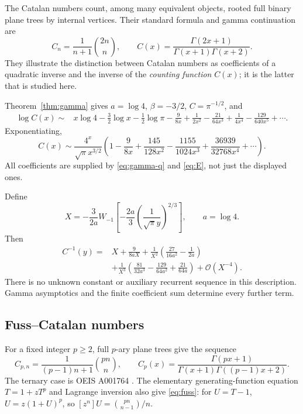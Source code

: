 \documentclass[11pt,a4paper]{article}
\numberwithin{equation}{section}
\theoremstyle{definition}
\theoremstyle{remark}
\newcommand{\bigO}{\mathcal O}
\begin{document}
The Catalan numbers count, among many equivalent objects, rooted full binary plane trees by internal vertices. Their standard formula and gamma continuation are \cite{oeiscatalan,wlcatalan}
\begin{equation}
 C_n=\frac1{n+1}\binom{2n}{n},\qquad
 C(x)=\frac{\Gamma(2x+1)}{\Gamma(x+1)\Gamma(x+2)}.
 \label{eq:catalan}
\end{equation}
They illustrate the distinction between Catalan numbers as coefficients of a quadratic inverse and the inverse of the \emph{counting function} $C(x)$; it is the latter that is studied here.

Theorem~\ref{thm:gamma} gives $a=\log4$, $\beta=-3/2$, $C=\pi^{-1/2}$, and
\begin{align}
 \log C(x)\sim{}&x\log4-\frac32\log x-\frac12\log\pi
 -\frac9{8x}+\frac1{2x^2}-\frac{21}{64x^3}
 +\frac1{4x^4}-\frac{129}{640x^5}+\cdots.
 \label{eq:catalan-log}
\end{align}
Exponentiating,
\begin{equation}
 C(x)\sim\frac{4^x}{\sqrt\pi x^{3/2}}
 \left(1-\frac9{8x}+\frac{145}{128x^2}
        -\frac{1155}{1024x^3}+\frac{36939}{32768x^4}+\cdots\right).
 \label{eq:catalan-amplitude}
\end{equation}
All coefficients are supplied by \eqref{eq:gamma-q} and \eqref{eq:E}, not just the displayed ones.

Define
\begin{equation}
 X=-\frac3{2a}W_{-1}\!\left[
       -\frac{2a}{3}\left(\frac1{\sqrt\pi y}\right)^{2/3}\right],
 \qquad a=\log4.
 \label{eq:catalan-core}
\end{equation}
Then
\begin{align}
 C^{-1}(y)={}&X+\frac9{8aX}
 +\frac1{X^2}\left(\frac{27}{16a^2}-\frac1{2a}\right)\nonumber\\
 &+\frac1{X^3}\left(\frac{81}{32a^3}-\frac{129}{64a^2}
                    +\frac{21}{64a}\right)+\bigO(X^{-4}).
 \label{eq:catalan-inverse}
\end{align}
There is no unknown constant or auxiliary recurrent sequence in this description. Gamma asymptotics and the finite coefficient sum determine every further term.

\subsection{Fuss--Catalan numbers}

For a fixed integer $p\ge2$, full $p$-ary plane trees give the sequence
\begin{equation}
 C_{p,n}=\frac1{(p-1)n+1}\binom{pn}{n},\qquad
 C_p(x)=\frac{\Gamma(px+1)}{\Gamma(x+1)\Gamma((p-1)x+2)}.
 \label{eq:fuss}
\end{equation}
The ternary case is OEIS A001764 \cite{oeisfuss}. The elementary generating-function equation $T=1+zT^p$ and Lagrange inversion also give \eqref{eq:fuss}: for $U=T-1$, $U=z(1+U)^p$, so
$[z^n]U=\binom{pn}{n-1}/n$.
\end{document}
